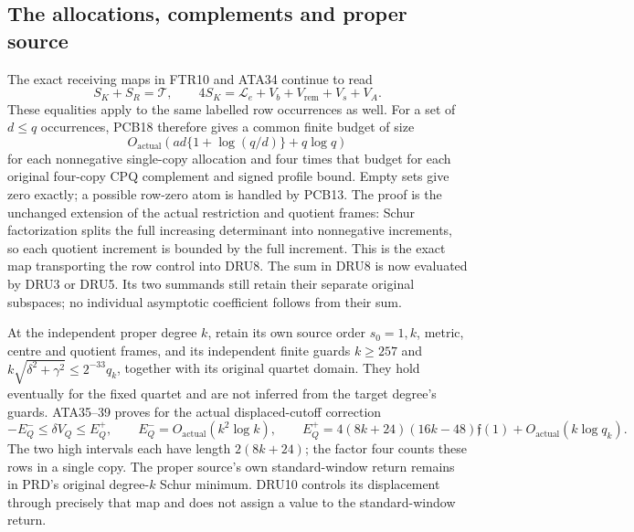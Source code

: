 \subsection{The allocations, complements and proper source}
The exact receiving maps in FTR10 and ATA34 continue to read
\[
 S_K+S_R=\mathcal T,\qquad
 4S_K=\mathcal L_e+V_b+V_{\mathrm{rem}}+V_s+V_A.
 \tag{DRU8}
\]
These equalities apply to the same labelled row occurrences as well.
For a set of $d\le q$ occurrences, PCB18 therefore gives a common
finite budget of size
\[
 O_{\mathrm{actual}}\!\left(
 ad\{1+\log(q/d)\}+q\log q\right)
 \tag{DRU9}
\]
for each nonnegative single-copy allocation and four times that
budget for each original four-copy CPQ complement and signed
profile bound.  Empty sets give zero exactly; a possible row-zero
atom is handled by PCB13.  The proof is the unchanged extension of
the actual restriction and quotient frames: Schur factorization
splits the full increasing determinant into nonnegative increments,
so each quotient increment is bounded by the full increment.
This is the exact map transporting the row control into DRU8.
The sum in DRU8 is now evaluated by DRU3 or DRU5.  Its two summands
still retain their separate original subspaces; no individual
asymptotic coefficient follows from their sum.

At the independent proper degree $k$, retain its own source order
$s_0=1,k$, metric, centre and quotient frames, and its independent
finite guards $k\ge257$ and
$k\sqrt{\delta^2+\gamma^2}\le2^{-33}q_k$, together with its original
quartet domain.  They hold eventually for the fixed quartet and are
not inferred from the target degree's guards.  ATA35--39 proves
for the actual displaced-cutoff correction
\[
 -E_Q^-\le\delta V_Q\le E_Q^+,\qquad
 E_Q^-=O_{\mathrm{actual}}(k^2\log k),\qquad
 E_Q^+=4(8k+24)(16k-48)\mathfrak f(1)
            +O_{\mathrm{actual}}(k\log q_k).
 \tag{DRU10}
\]
The two high intervals each have length $2(8k+24)$; the factor
four counts these rows in a single copy.  The proper source's own
standard-window return remains in PRD's original degree-$k$
Schur minimum.  DRU10 controls its displacement through precisely
that map and does not assign a value to the standard-window return.

